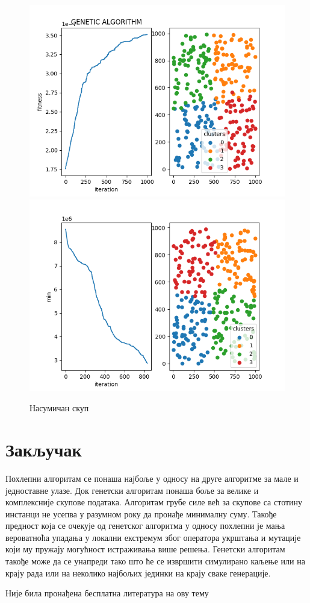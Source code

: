 \documentclass{article}
\begin{document}
\begin{figure}
    \includegraphics[width=\textwidth]{genetic_random.png}
    \includegraphics[width=\textwidth]{greedy_random.png}
    \caption{Насумичан скуп}\label{fig:foobar}
\end{figure}

\newpage
\section{Закључак}
Похлепни алгоритам се понаша најбоље у односу на друге алгоритме за мале и једноставне улазе.
Док генетски алгоритам понаша боље за велике и комплексније скупове података.
Алгоритам грубе силе већ за скупове са стотину инстанци не усепва у разумном року да пронађе минималну суму.
Такође предност која се очекује од генетског алгоритма у односу похлепни је мања вероватноћа упадања у локални екстремум
због оператора укрштања и мутације који му пружају могућност истраживања више решења.
Генетски алгоритам такође може да се унапреди тако што ће се извршити симулирано каљење или на крају рада или на неколико
најбољих јединки на крају сваке генерације.


\appendix

\newpage

\begin{thebibliography}{Literatura}
Није била пронађена бесплатна литература на ову тему
\end{thebibliography}
\end{document}
